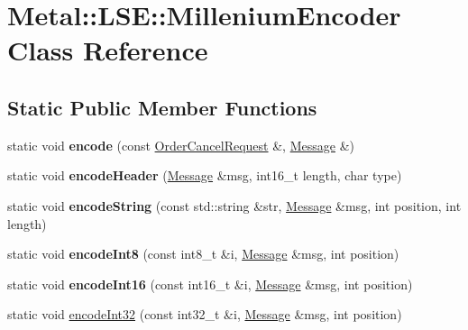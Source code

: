 \hypertarget{classMetal_1_1LSE_1_1MilleniumEncoder}{}\section{Metal\+:\+:L\+S\+E\+:\+:Millenium\+Encoder Class Reference}
\label{classMetal_1_1LSE_1_1MilleniumEncoder}
\subsection*{Static Public Member Functions}
\begin{DoxyCompactItemize}
\item 
\hypertarget{classMetal_1_1LSE_1_1MilleniumEncoder_a3ea7169021ec74a3f4313f62cb49db51}{}static void {\bfseries encode} (const \hyperlink{classMetal_1_1LSE_1_1OrderCancelRequest}{Order\+Cancel\+Request} \&, \hyperlink{classMetal_1_1Message}{Message} \&)\label{classMetal_1_1LSE_1_1MilleniumEncoder_a3ea7169021ec74a3f4313f62cb49db51}

\item 
\hypertarget{classMetal_1_1LSE_1_1MilleniumEncoder_a63f2ec04e18a7687ae0152dc26a3892f}{}static void {\bfseries encode\+Header} (\hyperlink{classMetal_1_1Message}{Message} \&msg, int16\+\_\+t length, char type)\label{classMetal_1_1LSE_1_1MilleniumEncoder_a63f2ec04e18a7687ae0152dc26a3892f}

\item 
\hypertarget{classMetal_1_1LSE_1_1MilleniumEncoder_aad363f6c35d20bb5c59166a54c007678}{}static void {\bfseries encode\+String} (const std\+::string \&str, \hyperlink{classMetal_1_1Message}{Message} \&msg, int position, int length)\label{classMetal_1_1LSE_1_1MilleniumEncoder_aad363f6c35d20bb5c59166a54c007678}

\item 
\hypertarget{classMetal_1_1LSE_1_1MilleniumEncoder_a1379a0e35ff5773b5518125ce278eec5}{}static void {\bfseries encode\+Int8} (const int8\+\_\+t \&i, \hyperlink{classMetal_1_1Message}{Message} \&msg, int position)\label{classMetal_1_1LSE_1_1MilleniumEncoder_a1379a0e35ff5773b5518125ce278eec5}

\item 
\hypertarget{classMetal_1_1LSE_1_1MilleniumEncoder_ae5aee9f5bd254750d840dbea3ad18ccc}{}static void {\bfseries encode\+Int16} (const int16\+\_\+t \&i, \hyperlink{classMetal_1_1Message}{Message} \&msg, int position)\label{classMetal_1_1LSE_1_1MilleniumEncoder_ae5aee9f5bd254750d840dbea3ad18ccc}

\item 
static void \hyperlink{classMetal_1_1LSE_1_1MilleniumEncoder_acbfb5a175ca3254a2110689239d074f9}{encode\+Int32} (const int32\+\_\+t \&i, \hyperlink{classMetal_1_1Message}{Message} \&msg, int position)
\end{DoxyCompactItemize}


